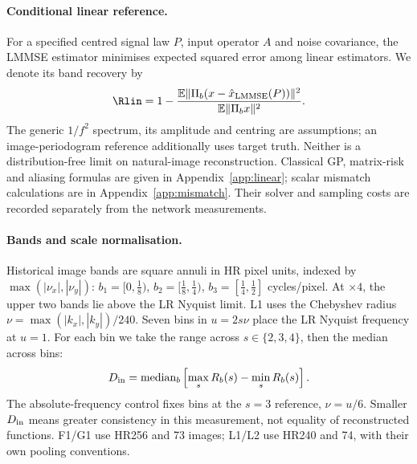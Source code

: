 \paragraph{Conditional linear reference.} For a specified centred signal
law $P$, input operator $A$ and noise covariance, the LMMSE estimator
minimises expected squared error among linear estimators. We denote its
band recovery by
\[
\Rlin=1-\frac{\mathbb E\|\Pi_b(x-\hat x_{\rm LMMSE}(P))\|^2}
{\mathbb E\|\Pi_bx\|^2}.
\]
The generic $1/f^2$ spectrum, its amplitude and centring are assumptions;
an image-periodogram reference additionally uses target truth. Neither
is a distribution-free limit on natural-image reconstruction. Classical
GP, matrix-risk and aliasing formulas are given in
Appendix~\ref{app:linear}; scalar mismatch calculations are in
Appendix~\ref{app:mismatch}. Their solver and sampling costs are recorded
separately from the network measurements.

\paragraph{Bands and scale normalisation.} Historical image bands are
square annuli in HR pixel units, indexed by $\max(|\nu_x|,|\nu_y|)$:
$b_1=[0,\tfrac18)$, $b_2=[\tfrac18,\tfrac14)$,
$b_3=[\tfrac14,\tfrac12]$ cycles/pixel. At $\times4$, the upper two bands
lie above the LR Nyquist limit. L1 uses the Chebyshev radius
$\nu=\max(|k_x|,|k_y|)/240$. Seven bins in $u=2s\nu$ place the LR Nyquist
frequency at $u=1$. For each bin we take the range across
$s\in\{2,3,4\}$, then the median across bins:
\begin{equation}\label{eq:collapse}
D_{\rm in}=\operatorname{median}_{b}\left[\max_s R_b(s)-\min_s R_b(s)\right].
\end{equation}
The absolute-frequency control fixes bins at the $s=3$ reference,
$\nu=u/6$. Smaller $D_{\rm in}$ means greater consistency in this
measurement, not equality of reconstructed functions. F1/G1 use HR256
and 73 images; L1/L2 use HR240 and 74, with their own pooling conventions.
